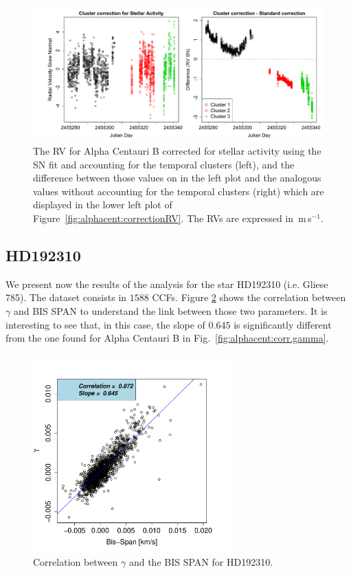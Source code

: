 \documentclass[11pt, oneside]{article}
\def\ms{\hbox{\,m\,s$^{-1}$}}         %
\begin{document}
\begin{figure}[htbp]
   \centering
\includegraphics[width = 6in]{AlphaCenB_clusters_residuals.pdf}  
   \caption{The RV for Alpha Centauri B corrected for stellar activity using the SN fit and accounting for the temporal clusters (left), and the difference between those values on in the left plot and the analogous values without accounting for the temporal clusters (right) which are displayed in the lower left plot of Figure~\ref{fig:alphacent:correctionRV}. The RVs are expressed in \ms.}
   \label{fig:alphacent:clusters_residuals}
\end{figure}

\subsection{HD192310}  \label{sec:Gl785}

We present now the results of the analysis for the star HD192310 (i.e. Gliese 785). The dataset consists in $1588$ CCFs. Figure \ref{fig:Gliese785:corr.gamma} shows the correlation between $\gamma$ and BIS SPAN to understand the link between those two parameters. It is interesting to see that, in this case, the slope of $0.645$ is significantly different from the one found for Alpha Centauri B in Fig.~\ref{fig:alphacent:corr.gamma}.
%
\begin{figure}[htbp]
   \centering
\includegraphics[height = 3in]{HD19231_[2]gamma_vs_bisspan.pdf} 
   \caption{Correlation between $\gamma$ and the BIS SPAN for HD192310.}
   \label{fig:Gliese785:corr.gamma}
\end{figure}
\end{document}

